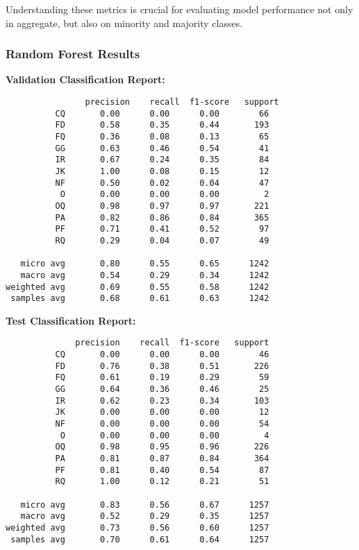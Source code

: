 \documentclass{article}
\begin{document}
Understanding these metrics is crucial for evaluating model performance not only in aggregate, but also on minority and majority classes.


\subsubsection{Random Forest Results}
\textbf{Validation Classification Report:}
\begin{verbatim}
                precision    recall  f1-score   support
          CQ       0.00      0.00      0.00        66
          FD       0.58      0.35      0.44       193
          FQ       0.36      0.08      0.13        65
          GG       0.63      0.46      0.54        41
          IR       0.67      0.24      0.35        84
          JK       1.00      0.08      0.15        12
          NF       0.50      0.02      0.04        47
           O       0.00      0.00      0.00         2
          OQ       0.98      0.97      0.97       221
          PA       0.82      0.86      0.84       365
          PF       0.71      0.41      0.52        97
          RQ       0.29      0.04      0.07        49

   micro avg       0.80      0.55      0.65      1242
   macro avg       0.54      0.29      0.34      1242
weighted avg       0.69      0.55      0.58      1242
 samples avg       0.68      0.61      0.63      1242
\end{verbatim}
\textbf{Test Classification Report:}
\begin{verbatim}
              precision    recall  f1-score   support
          CQ       0.00      0.00      0.00        46
          FD       0.76      0.38      0.51       226
          FQ       0.61      0.19      0.29        59
          GG       0.64      0.36      0.46        25
          IR       0.62      0.23      0.34       103
          JK       0.00      0.00      0.00        12
          NF       0.00      0.00      0.00        54
           O       0.00      0.00      0.00         4
          OQ       0.98      0.95      0.96       226
          PA       0.81      0.87      0.84       364
          PF       0.81      0.40      0.54        87
          RQ       1.00      0.12      0.21        51

   micro avg       0.83      0.56      0.67      1257
   macro avg       0.52      0.29      0.35      1257
weighted avg       0.73      0.56      0.60      1257
 samples avg       0.70      0.61      0.64      1257

\end{verbatim}
\end{document}
